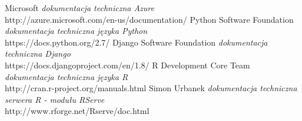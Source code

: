 \documentclass[licencjacka]{pracamgr}
\begin{document}
\begin{thebibliography}{99}
 Microsoft
\textit{dokumentacja techniczna Azure} \\
http://azure.microsoft.com/en-us/documentation/
Python Software Foundation
\textit{dokumentacja techniczna języka Python} \\
https://docs.python.org/2.7/
 Django Software Foundation
\textit{dokumentacja techniczna Django} \\ 
https://docs.djangoproject.com/en/1.8/
 R Development Core Team
\textit{dokumentacja techniczna języka R} \\
http://cran.r-project.org/manuals.html
 Simon Urbanek
\textit{dokumentacja techniczna serwera R - modułu RServe} \\
http://www.rforge.net/Rserve/doc.html
\end{thebibliography}
\end{document}
